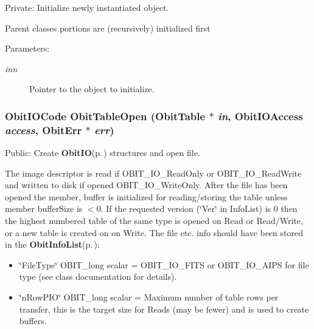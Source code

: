 Private: Initialize newly instantiated object. 

Parent classes portions are (recursively) initialized first \begin{Desc}
\item[Parameters:]
\begin{description}
\item[{\em inn}]Pointer to the object to initialize. \end{description}
\end{Desc}
\subsubsection{\setlength{\rightskip}{0pt plus 5cm}Obit\-IOCode Obit\-Table\-Open ({\bf Obit\-Table} $\ast$ {\em in}, Obit\-IOAccess {\em access}, {\bf Obit\-Err} $\ast$ {\em err})}\label{ObitTable_8c_a22}


Public: Create {\bf Obit\-IO}{\rm (p.\,\pageref{structObitIO})} structures and open file. 

The image descriptor is read if OBIT\_\-IO\_\-Read\-Only or OBIT\_\-IO\_\-Read\-Write and written to disk if opened OBIT\_\-IO\_\-Write\-Only. After the file has been opened the member, buffer is initialized for reading/storing the table unless member buffer\-Size is $<$0. If the requested version (\char`\"{}Ver\char`\"{} in Info\-List) is 0 then the highest numbered table of the same type is opened on Read or Read/Write, or a new table is created on on Write. The file etc. info should have been stored in the {\bf Obit\-Info\-List}{\rm (p.\,\pageref{structObitInfoList})}: \begin{itemize}
\item \char`\"{}File\-Type\char`\"{} OBIT\_\-long scalar = OBIT\_\-IO\_\-FITS or OBIT\_\-IO\_\-AIPS for file type (see class documentation for details). \item \char`\"{}n\-Row\-PIO\char`\"{} OBIT\_\-long scalar = Maximum number of table rows per transfer, this is the target size for Reads (may be fewer) and is used to create buffers. 
\end{itemize}
